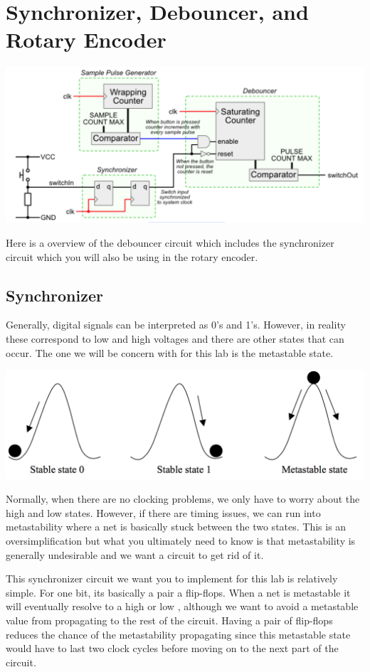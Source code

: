 \documentclass[11pt]{article}
\begin{document}
\section{Synchronizer, Debouncer, and Rotary Encoder}

\includegraphics[width=\textwidth]{images/lab2_fig2.png}

Here is a overview of the debouncer circuit which includes the synchronizer circuit which you will also be using in the rotary encoder. 

\subsection{Synchronizer}
Generally, digital signals can be interpreted as 0's and 1's. However, in reality these correspond to low and high voltages and there are other states that can occur. The one we will be concern with for this lab is the metastable state.

\includegraphics[width=\textwidth]{images/lab2_fig3.png}

Normally, when there are no clocking problems, we only have to worry about the high and low states. However, if there are timing issues, we can run into metastability  where a net is basically stuck between the two states. This is an oversimplification but what you ultimately need to know is that metastability is generally undesirable and we want a circuit to get rid of it. 

This synchronizer circuit we want you to implement for this lab is relatively simple. For one bit, its basically a pair a flip-flops. When a net is metastable it will eventually resolve to a high or low , although we want to avoid a metastable value from propagating to the rest of the circuit. Having a pair of flip-flops reduces the chance of the metastability propagating since this metastable state would have to last two clock cycles before moving on to the next part of the circuit.
\end{document}
